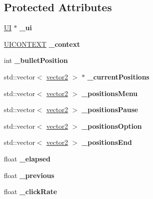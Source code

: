 \subsection*{Protected Attributes}
\begin{DoxyCompactItemize}
\item 
\hypertarget{class_u_i_bullet_a75026bf852c57c18b5b4147cd65b1569}{}\label{class_u_i_bullet_a75026bf852c57c18b5b4147cd65b1569} 
\hyperlink{class_u_i}{UI} $\ast$ {\bfseries \+\_\+ui}
\item 
\hypertarget{class_u_i_bullet_a40405d6b8e46afab0e80e492d18a7605}{}\label{class_u_i_bullet_a40405d6b8e46afab0e80e492d18a7605} 
\hyperlink{struct_u_i_c_o_n_t_e_x_t}{U\+I\+C\+O\+N\+T\+E\+XT} {\bfseries \+\_\+context}
\item 
\hypertarget{class_u_i_bullet_a31d3c1d359452ec5b42818cba93ed826}{}\label{class_u_i_bullet_a31d3c1d359452ec5b42818cba93ed826} 
int {\bfseries \+\_\+bullet\+Position}
\item 
\hypertarget{class_u_i_bullet_a96bef745931cfe60f0589a8bfb3f3c59}{}\label{class_u_i_bullet_a96bef745931cfe60f0589a8bfb3f3c59} 
std\+::vector$<$ \hyperlink{structvector2}{vector2} $>$ $\ast$ {\bfseries \+\_\+current\+Positions}
\item 
\hypertarget{class_u_i_bullet_a86f3119876cf8280f4e3fdf063b066df}{}\label{class_u_i_bullet_a86f3119876cf8280f4e3fdf063b066df} 
std\+::vector$<$ \hyperlink{structvector2}{vector2} $>$ {\bfseries \+\_\+positions\+Menu}
\item 
\hypertarget{class_u_i_bullet_ae76d00fdcf1303e1f5d0044c2f64821c}{}\label{class_u_i_bullet_ae76d00fdcf1303e1f5d0044c2f64821c} 
std\+::vector$<$ \hyperlink{structvector2}{vector2} $>$ {\bfseries \+\_\+positions\+Pause}
\item 
\hypertarget{class_u_i_bullet_a02817d444f3f05df2e8ef4e11df1f9ae}{}\label{class_u_i_bullet_a02817d444f3f05df2e8ef4e11df1f9ae} 
std\+::vector$<$ \hyperlink{structvector2}{vector2} $>$ {\bfseries \+\_\+positions\+Option}
\item 
\hypertarget{class_u_i_bullet_a899fbe9c31a16f1247bbdc07063c6069}{}\label{class_u_i_bullet_a899fbe9c31a16f1247bbdc07063c6069} 
std\+::vector$<$ \hyperlink{structvector2}{vector2} $>$ {\bfseries \+\_\+positions\+End}
\item 
\hypertarget{class_u_i_bullet_aa562034e45e7f07703f607d0b7d2d2b2}{}\label{class_u_i_bullet_aa562034e45e7f07703f607d0b7d2d2b2} 
float {\bfseries \+\_\+elapsed}
\item 
\hypertarget{class_u_i_bullet_ad39273a550d74d22e31d70b588486bde}{}\label{class_u_i_bullet_ad39273a550d74d22e31d70b588486bde} 
float {\bfseries \+\_\+previous}
\item 
\hypertarget{class_u_i_bullet_a91bc665a17c15812e6657d76b3958294}{}\label{class_u_i_bullet_a91bc665a17c15812e6657d76b3958294} 
float {\bfseries \+\_\+click\+Rate}
\end{DoxyCompactItemize}
